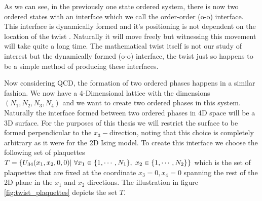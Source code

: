 \documentclass[english,twoside,openright]{UH_TCM_MSc}
\begin{document}
As we can see, in the previously one state ordered system, there is now two ordered states with an interface which we call the order-order (o-o) interface. This interface is dynamically formed and it's positioning is not dependent on the location of the twist \cite[ch. 3]{twist}. Naturally it will move freely but witnessing this movement will take quite a long time. The mathematical twist itself is not our study of interest but the dynamically formed (o-o) interface, the twist just so happens to be a simple method of producing these interfaces. 

Now considering QCD, the formation of two ordered phases happens in a similar fashion. We now have a 4-Dimensional lattice with the dimensions $(N_1,N_2,N_3,N_4)$ and we want to create two ordered phases in this system. Naturally the interface formed between two ordered phases in 4D space will be a 3D surface. For the purposes of this thesis we will restrict the surface to be formed perpendicular to the $x_3-$direction, noting that this choice is completely arbitrary as it were for the 2D Ising model. To create this interface we choose the following set of plaquettes $T=\{U_{34}(x_1,x_2,0,0)| \hspace{3px} \forall x_1 \in \{1,\cdots,N_1\}, \hspace{3px} x_2 \in \{1,\cdots,N_2\}\}$ which is the set of plaquettes that are fixed at the coordinate $x_3=0,x_4=0$ spanning the rest of the 2D plane in the $x_1$ and $x_2$ directions. The illustration in figure \ref{fig:twist_plaquettes} depicts the set $T$. 
\end{document}
